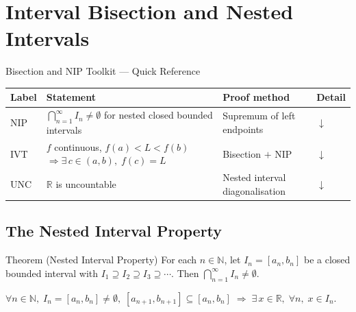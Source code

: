 
\section{Interval Bisection and Nested Intervals}
\label{sec:bisection-nested}

\begin{toolkitbox}{Bisection and NIP Toolkit — Quick Reference}
\small
\begin{tabular}{l l l l}
\toprule
\textbf{Label} & \textbf{Statement} & \textbf{Proof method} & \textbf{Detail} \\
\midrule
NIP
  & $\bigcap_{n=1}^{\infty}I_n\neq\emptyset$ for nested closed bounded intervals
  & Supremum of left endpoints
  & \hyperref[thm:nested-interval-property]{$\downarrow$} \\[4pt]
IVT
  & $f$ continuous, $f(a)<L<f(b)$
    $\Rightarrow\exists\,c\in(a,b),\;f(c)=L$
  & Bisection $+$ NIP
  & \hyperref[prop:ivt-bisection]{$\downarrow$} \\[4pt]
UNC
  & $\mathbb{R}$ is uncountable
  & Nested interval diagonalisation
  & \hyperref[prop:r-uncountable]{$\downarrow$} \\
\bottomrule
\end{tabular}
\end{toolkitbox}

\subsection*{The Nested Interval Property}
\label{subsec:nip}

\begin{theorembox}{Theorem (Nested Interval Property)}
\label{thm:nested-interval-property}
For each $n\in\mathbb{N}$, let $I_n=[a_n,b_n]$ be a closed bounded interval
with $I_1\supseteq I_2\supseteq I_3\supseteq\cdots$. Then
$\displaystyle\bigcap_{n=1}^{\infty}I_n\neq\emptyset$.
\end{theorembox}

\begin{remark}
$\forall n\in\mathbb{N},\;I_n=[a_n,b_n]\neq\emptyset,\;
[a_{n+1},b_{n+1}]\subseteq[a_n,b_n]
\;\Longrightarrow\;
\exists\,x\in\mathbb{R},\;\forall n,\;x\in I_n$.
\end{remark}

